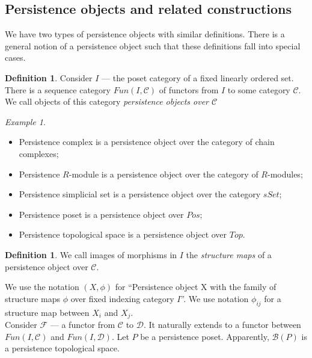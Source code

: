 \documentclass[english,12pt]{article}
\newcounter{stmcounter}[section]
\numberwithin{equation}{section}
\theoremstyle{definition}
\newtheorem{definition}[stmcounter]{Definition}
\theoremstyle{remark}
\newtheorem{example}[stmcounter]{Example}
\newcommand{\define}[1]{{\textit{#1}}}
\begin{document}
\subsection{Persistence objects and related constructions}

We have two types of persistence objects with similar definitions. There is a general notion of a persistence object such that these definitions fall into special cases.\\

\begin{definition}
  Consider $I$ --- the poset category of a fixed linearly ordered set. There is a sequence category $Fun(I, \mathcal{C})$ of functors from $I$ to some category $\mathcal{C}$. We call objects of this category \define{persistence objects over $\mathcal{C}$}
\end{definition}

\begin{example} ~ \par
  \begin{itemize}
    \item Persistence complex is a persistence object over the category of chain complexes;
    \item Persistence $R$-module is a persistence object over the category of $R$-modules; \cite[Definition 2.15]{GS16}
    \item Persistence simplicial set is a persistence object over the category $sSet$;
    \item Persistence poset is a persistence object over $Pos$;
    \item Persistence topological space is a persistence object over $Top$.
  \end{itemize}
\end{example}

\begin{definition}
  We call images of morphisms in $I$ the \define{structure maps} of a persistence object over $\mathcal{C}$.
\end{definition}

We use the notation $(X,\phi)$ for ``Persistence object X with the family of structure maps $\phi$ over fixed indexing category $I$''. We use notation $\phi_{ij}$ for a structure map between $X_i$ and $X_{j}$.\\

Consider $\mathcal{F}$ --- a functor from $\mathcal{C}$ to $\mathcal{D}$. It naturally extends to a functor between $Fun(I,\mathcal{C})$ and $Fun(I,\mathcal{D})$. Let $P$ be a persistence poset. Apparently, $\mathcal{B}(P)$ is a persistence topological space.\\
\end{document}
